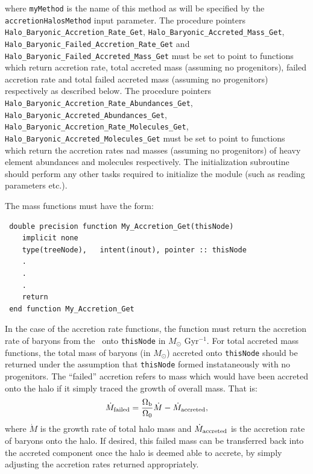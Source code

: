 where {\tt myMethod} is the name of this method as will be specified by the {\tt accretionHalosMethod} input parameter. The procedure pointers {\tt Halo\_Baryonic\_Accretion\_Rate\_Get}, {\tt Halo\_Baryonic\_Accreted\_Mass\_Get}, {\tt Halo\_Baryonic\_Failed\_Accretion\_Rate\_Get} and {\tt Halo\_Baryonic\_Failed\_Accreted\_Mass\_Get} must be set to point to functions which return accretion rate, total accreted mass (assuming no progenitors), failed accretion rate and total failed accreted mass (assuming no progenitors) respectively as described below. The procedure pointers {\tt Halo\_Baryonic\_Accretion\_Rate\_Abundances\_Get}, {\tt Halo\_Baryonic\_Accreted\_Abundances\_Get}, {\tt Halo\_Baryonic\_Accretion\_Rate\_Molecules\_Get}, {\tt Halo\_Baryonic\_Accreted\_Molecules\_Get} must be set to point to functions which return the accretion rates nad masses (assuming no progenitors) of heavy element abundances and molecules respectively. The initialization subroutine should perform any other tasks required to initialize the module (such as reading parameters etc.).

The mass functions must have the form:
\begin{verbatim}
 double precision function My_Accretion_Get(thisNode)
    implicit none
    type(treeNode),   intent(inout), pointer :: thisNode
    .
    .
    .
    return
 end function My_Accretion_Get
\end{verbatim}
In the case of the accretion rate functions, the function must return the accretion rate of baryons from the \IGM\ onto {\tt thisNode} in $M_\odot$ Gyr$^{-1}$. For total accreted mass functions, the total mass of baryons (in $M_\odot$) accreted onto {\tt thisNode} should be returned under the assumption that {\tt thisNode} formed instataneously with no progenitors. The ``failed'' accretion refers to mass which would have been accreted onto the halo if it simply traced the growth of overall mass. That is:
\begin{equation}
 \dot{M}_{\rm failed} = {\Omega_{\rm b} \over \Omega_0} \dot{M} - \dot{M}_{\rm accreted},
\end{equation}
where $\dot{M}$ is the growth rate of total halo mass and $\dot{M}_{\rm accreted}$ is the accretion rate of baryons onto the halo. If desired, this failed mass can be transferred back into the accreted component once the halo is deemed able to accrete, by simply adjusting the accretion rates returned appropriately.

